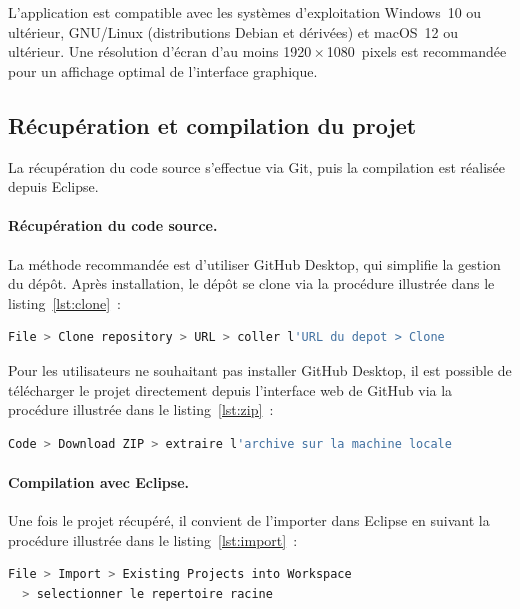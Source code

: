 L'application est compatible avec les systèmes d'exploitation Windows~10 ou
ultérieur, GNU/Linux (distributions Debian et dérivées) et macOS~12 ou ultérieur.
Une résolution d'écran d'au moins 1920\,$\times$\,1080~pixels est recommandée pour
un affichage optimal de l'interface graphique.

\subsection{Récupération et compilation du projet}
\label{subsec:compilation}

La récupération du code source s'effectue via Git, puis la compilation est
réalisée depuis Eclipse.

\paragraph{Récupération du code source.}
La méthode recommandée est d'utiliser GitHub Desktop, qui simplifie la gestion du
dépôt. Après installation, le dépôt se clone via la procédure illustrée dans le
listing~\ref{lst:clone}~:

\begin{lstlisting}[style=java, language=bash, label=lst:clone,
    caption={Clonage du dépôt via GitHub Desktop}]
File > Clone repository > URL > coller l'URL du depot > Clone
\end{lstlisting}

Pour les utilisateurs ne souhaitant pas installer GitHub Desktop, il est possible
de télécharger le projet directement depuis l'interface web de GitHub via la
procédure illustrée dans le listing~\ref{lst:zip}~:

\begin{lstlisting}[style=java, language=bash, label=lst:zip,
    caption={Téléchargement du projet via l'interface web}]
Code > Download ZIP > extraire l'archive sur la machine locale
\end{lstlisting}

\paragraph{Compilation avec Eclipse.}
Une fois le projet récupéré, il convient de l'importer dans Eclipse en
suivant la procédure illustrée dans le listing~\ref{lst:import}~:

\begin{lstlisting}[style=java, language=bash, label=lst:import,
    caption={Import du projet dans Eclipse}]
File > Import > Existing Projects into Workspace
  > selectionner le repertoire racine
\end{lstlisting}

